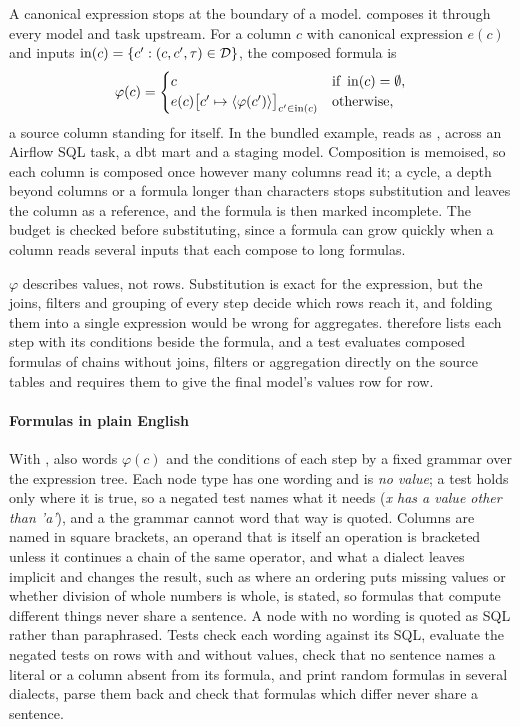A canonical expression stops at the boundary of a model.  composes it
through every model and task upstream. For a column $c$ with canonical expression $e(c)$ and
inputs $\operatorname{in}(c) = \{c' : (c, c', \tau) \in \mathcal{D}\}$, the composed formula is
\begin{equation}
  \varphi(c) =
  \begin{cases}
    c & \text{if } \operatorname{in}(c) = \emptyset,\\
    e(c)\big[c' \mapsto \langle \varphi(c') \rangle\big]_{c' \in \operatorname{in}(c)} & \text{otherwise},
  \end{cases}
  \label{eq:compose}
\end{equation}
a source column standing for itself. In the bundled example,  reads as
\cmd{\exLtvFormula{}}, across an Airflow SQL task, a dbt mart and a staging model. Composition is
memoised, so each column is composed once however many columns read it; a cycle, a depth beyond
\maxDepth{} columns or a formula longer than \maxComposed{} characters stops substitution and
leaves the column as a reference, and the formula is then marked incomplete. The budget is checked
before substituting, since a formula can grow quickly when a column reads several inputs that
each compose to long formulas.

$\varphi$ describes values, not rows. Substitution is exact for the expression, but the joins,
filters and grouping of every step decide which rows reach it, and folding them into a single
expression would be wrong for aggregates.  therefore lists each step with its
conditions beside the formula, and a test evaluates composed formulas of chains without joins,
filters or aggregation directly on the source tables and requires them to give the final model's
values row for row.

\paragraph{Formulas in plain English}
With ,  also words $\varphi(c)$ and the conditions of each step by a
fixed grammar over the expression tree. Each node type has one wording and  is
\emph{no value}; a test holds only where it is true, so a negated test names what it needs
(\emph{x has a value other than 'a'}), and a  the grammar cannot word that way is
quoted. Columns are named in square brackets, an operand that is itself an operation is bracketed
unless it continues a chain of the same operator, and what a dialect leaves implicit and changes
the result, such as where an ordering puts missing values or whether division of whole numbers
is whole, is stated, so formulas that compute different things never share a sentence. A node
with no wording is quoted as SQL rather than paraphrased. Tests check each wording against its
SQL, evaluate the negated tests on rows with and without values, check that no sentence names a
literal or a column absent from its formula, and print random formulas in several dialects, parse
them back and check that formulas which differ never share a sentence.

